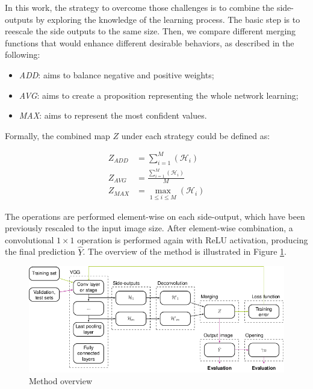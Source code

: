 In this work, the strategy to overcome those challenges is to combine the side-outputs by exploring the knowledge of the learning process. The basic step is to reescale the side outputs to the same size. Then, we compare different merging functions that would enhance different desirable behaviors, as described in the following: 
\begin{itemize}
\item \textit{ADD}: aims to balance negative and positive weights;
\item \textit{AVG}: aims to create a proposition representing the whole network learning;  
\item \textit{MAX}: aims to represent the most confident values. 
\end{itemize}  

Formally, the combined map $Z$ under each strategy could be defined as:

\begin{align}
Z_{ADD} &= \sum_{i=1}^{M}(\mathcal{H}_i)\\
Z_{AVG} &= \frac{\sum_{i=1}^{M}(\mathcal{H}_i)}{M}\\
Z_{MAX} &= \max_{1 \leq i \leq M} (\mathcal{H}_i)
\end{align} 

The operations are performed element-wise on each side-output, which have been previously rescaled to the input image size. After element-wise combination, a convolutional $1\times1$ operation is performed again with ReLU activation, producing the final prediction $\hat{Y}$. The overview of the method is illustrated in Figure \ref{fig:side_outputs_method}.

\begin{figure}[ht]
  \centering
  \includegraphics[width=1.\columnwidth]{figures/falreis/side_outputs_method.png}
  \caption{Method overview}
  \label{fig:side_outputs_method}
\end{figure}

